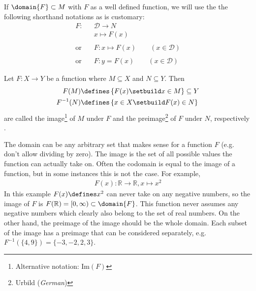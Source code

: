 \begin{flushleft}
    If $\domain{F}\subset M$ with $F$ as a well defined function, we will use the
    the following shorthand notations as is customary:
    \begin{align*}
        F:\;&\mathcal{D} \rightarrow N\\
          &x\mapsto F(x)\\\\
        \text{or}\quad&F:x\mapsto F(x)\qquad{(x\in\mathcal{D})}\\\\
        \text{or}\quad&F:y=F(x)\qquad{(x\in\mathcal{D})}
    \end{align*}
\end{flushleft}

\begin{definition}\label{def-image-preimage}
    Let $F : X \rightarrow Y$ be a function where $M\subseteq X$ and $N \subseteq Y$.
    Then
    \begin{align}
        F(M) &\defines \left\{F(x) \setbuild x \in M \right\}\subseteq Y \label{eq-image} \\
        F^{-1}(N) &\defines \left\{x \in X \setbuild F(x) \in N \right\}\label{eq-preimage}
    \end{align}
    are called the image\footnote{Alternative notation: $\text{Im}(F)$} of $M$ 
    under $F$ and the preimage\footnote{Urbild (\textit{German})} of $F$ under $N$, respectively 
    \cite[p.16]{liesenMehrmann2015}.
\end{definition}

\begin{rem}
    The domain can be any arbitrary set that makes sense for a function $F$ (e.g.
    don't allow dividing by zero). The image is the set of all possible values the
    function can actually take on. Often the codomain is equal to the image of a
    function, but in some instances this is not the case. For example,
    \begin{align*}
        F(x):\mathbb{R}\rightarrow\mathbb{R},x\mapsto x^2
    \end{align*}
    In this example $F(x)\defines x^2$ can never take on any negative numbers, 
    so the image of $F$ is $F(\mathbb{R})=[0,\infty)\subset\domain{F}$. This 
    function never assumes any negative numbers which clearly also belong to the
    set of real numbers. On the other hand, the preimage of the image should be 
    the whole domain. Each subset of the image has a preimage that can be considered
    separately, e.g. $ F^{-1}(\{4,9\})=\{-3,-2,2,3\}$. 
\end{rem}

